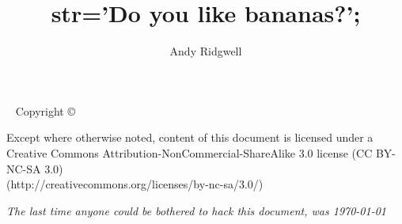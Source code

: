 \documentclass{tufte-book} %
\title{str='Do you like bananas?';} %
\author{Andy Ridgwell} %
\begin{document}
\frontmatter


\maketitle %


\newpage
\begin{fullwidth}
~\vfill
\thispagestyle{empty}
\setlength{\parindent}{0pt}
\setlength{\parskip}{\baselineskip}
Copyright \copyright\ \the\year\ \thanklessauthor

\par{}

\par Except where otherwise noted, content of this document is licensed under a 
\\Creative Commons Attribution-NonCommercial-ShareAlike 3.0 license (CC BY-NC-SA 3.0) 
\\(http://creativecommons.org/licenses/by-nc-sa/3.0/)

\par\textit{The last time anyone could be bothered to hack this document, was \today}
\end{fullwidth}


\tableofcontents %

\setcounter{chapter}{0}%


\listoffigures %


\listoftables %

\end{document}
